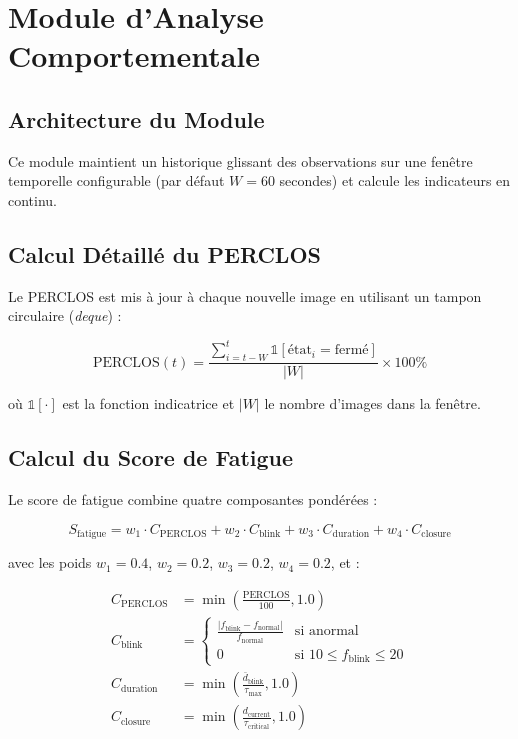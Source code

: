 \section{Module d'Analyse Comportementale}

\subsection{Architecture du Module}

Ce module maintient un historique glissant des observations sur une fenêtre temporelle configurable (par défaut $W = 60$ secondes) et calcule les indicateurs en continu.

\subsection{Calcul Détaillé du PERCLOS}

Le PERCLOS est mis à jour à chaque nouvelle image en utilisant un tampon circulaire (\textit{deque}) :

\begin{equation}
\text{PERCLOS}(t) = \frac{\sum_{i=t-W}^{t} \mathbb{1}[\text{état}_i = \text{fermé}]}{|W|} \times 100\%
\label{eq:perclos_detailed}
\end{equation}

où $\mathbb{1}[\cdot]$ est la fonction indicatrice et $|W|$ le nombre d'images dans la fenêtre.

\subsection{Calcul du Score de Fatigue}

Le score de fatigue combine quatre composantes pondérées :

\begin{equation}
\boxed{
S_{\text{fatigue}} = w_1 \cdot C_{\text{PERCLOS}} + w_2 \cdot C_{\text{blink}} + w_3 \cdot C_{\text{duration}} + w_4 \cdot C_{\text{closure}}
}
\label{eq:fatigue_score}
\end{equation}

avec les poids $w_1 = 0.4$, $w_2 = 0.2$, $w_3 = 0.2$, $w_4 = 0.2$, et :

\begin{align}
C_{\text{PERCLOS}} &= \min\left(\frac{\text{PERCLOS}}{100}, 1.0\right) \label{eq:c_perclos} \\
C_{\text{blink}} &= \begin{cases}
    \frac{|f_{\text{blink}} - f_{\text{normal}}|}{f_{\text{normal}}} & \text{si anormal} \\
    0 & \text{si } 10 \leq f_{\text{blink}} \leq 20
\end{cases} \label{eq:c_blink} \\
C_{\text{duration}} &= \min\left(\frac{\bar{d}_{\text{blink}}}{\tau_{\text{max}}}, 1.0\right) \label{eq:c_duration} \\
C_{\text{closure}} &= \min\left(\frac{d_{\text{current}}}{\tau_{\text{critical}}}, 1.0\right) \label{eq:c_closure}
\end{align}

